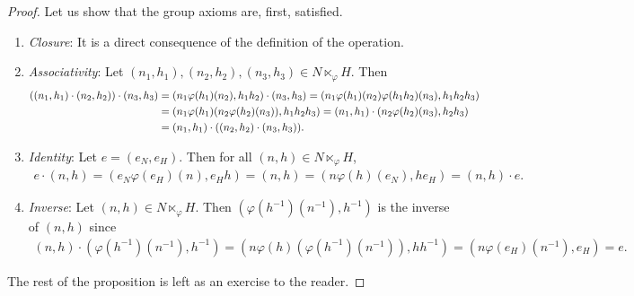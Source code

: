 \begin{proof}
    Let us show that the group axioms are, first, satisfied.
    \begin{enumerate}
        \item \textit{Closure}: It is a direct consequence of the definition of the operation.
        \item \textit{Associativity}: Let $(n_{1},h_{1}),(n_{2},h_{2}),(n_{3},h_{3}) \in N \ltimes_{\varphi} H$. Then
        \begin{align}
            ((n_{1},h_{1})\cdot(n_{2},h_{2}))\cdot(n_{3},h_{3}) &= (n_{1}\varphi(h_{1})(n_{2}),h_{1}h_{2})\cdot(n_{3},h_{3}) = (n_{1}\varphi(h_{1})(n_{2})\varphi(h_{1}h_{2})(n_{3}),h_{1}h_{2}h_{3}) \notag \\
            &= (n_{1} \varphi(h_{1})(n_{2}\varphi(h_{2})(n_{3})),h_{1}h_{2}h_{3}) = (n_{1},h_{1})\cdot(n_{2}\varphi(h_{2})(n_{3}),h_{2}h_{3}) \notag \\
            &= (n_{1},h_{1})\cdot((n_{2},h_{2})\cdot(n_{3},h_{3})).
        \end{align}
        \item \textit{Identity}: Let $e = (e_{N},e_{H})$. Then for all $(n,h) \in N \ltimes_{\varphi} H$,
        \begin{align}
            e \cdot (n,h) = (e_{N}\varphi(e_{H})(n),e_{H}h) = (n,h) = (n\varphi(h)(e_{N}),he_{H}) = (n,h) \cdot e.
        \end{align}
        \item \textit{Inverse}: Let $(n,h) \in N \ltimes_{\varphi} H$. Then $(\varphi(h^{-1})(n^{-1}),h^{-1})$ is the inverse of $(n,h)$ since
        \begin{align}
            (n,h) \cdot (\varphi(h^{-1})(n^{-1}),h^{-1}) = (n\varphi(h)(\varphi(h^{-1})(n^{-1})),hh^{-1}) = (n \varphi(e_{H})(n^{-1}),e_{H}) = e.
        \end{align}
    \end{enumerate}
    The rest of the proposition is left as an exercise to the reader.
\end{proof}

